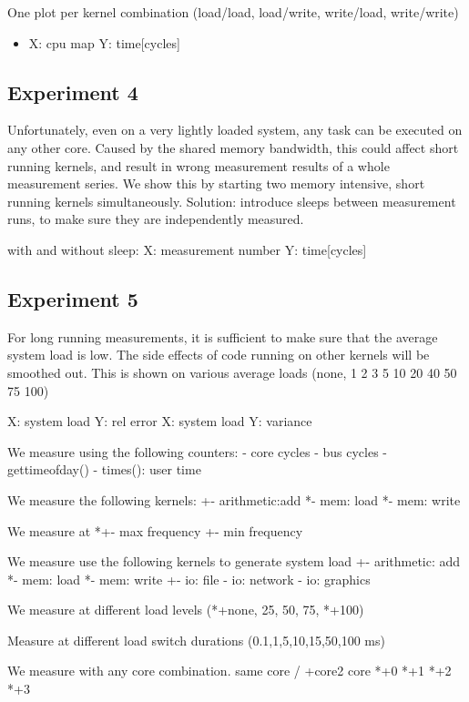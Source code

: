 \documentclass[a4paper,12pt]{article}
\begin{document}
One plot per kernel combination (load/load, load/write, write/load, write/write)
\begin{itemize}
\item X: cpu map Y: time[cycles]
\end{itemize}


\subsection{Experiment 4}
Unfortunately, even on a very lightly loaded system, any task can be executed on any other core. Caused by the shared memory bandwidth, this could affect short running kernels, and result in wrong measurement results of a whole measurement series. We show this by starting two memory intensive, short running kernels simultaneously. Solution: introduce sleeps between measurement runs, to make sure they are independently measured.

with and without sleep: X: measurement number Y: time[cycles]

\subsection{Experiment 5}
For long running measurements, it is sufficient to make sure that the average system load is low. The side effects of code running on other kernels will be smoothed out. This is shown on various average loads (none, 1 2 3 5 10 20 40 50 75 100)

X: system load Y: rel error
X: system load Y: variance

We measure using the following counters:
- core cycles
- bus cycles
- gettimeofday()
- times(): user time

We measure the following kernels:
+- arithmetic:add
*- mem: load
*- mem: write

We measure at 
*+- max frequency
+- min frequency

We measure use the following kernels to generate system load
+- arithmetic: add
*- mem: load
*- mem: write
+- io: file 
- io: network
- io: graphics

We measure at different load levels (*+none, 25, 50, 75, *+100)

Measure at different load switch durations (0.1,1,5,10,15,50,100 ms)

We measure with any core combination.
same core / +core2
core *+0 *+1 *+2 *+3
\end{document}
